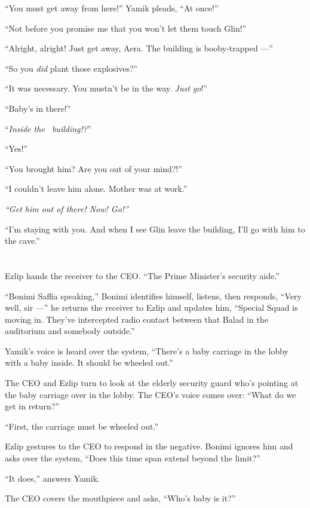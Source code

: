 \documentclass[twoside,11pt]{book}
\begin{document}
``You must get away from here!'' Yamik pleads, ``At
once!''

``Not before you promise me that you won't let them touch Glin!''

``Alright, alright! Just get away, Aera{. T}he building is
booby-trapped ---''

``So you \textit{did}{ }plant those explosives?''

``It was necessary.
You mustn't be in the way. \textit{Just go}!''

``Baby's in there!''

``\textit{Inside the~ building!?}''

``Yes!''

``You brought him? Are you out of your mind?!''

``I couldn't leave him alone{. } Mother was at
work.''

\textit{``Get him out of there! Now! Go!'' }

``I'm staying with you. And when I see Glin leave the building, I'll go with him to the
cave.''



\chapter{}

Ezlip hands the receiver to the CEO. ``The Prime Minister's security aide.''

``Bonimi Saffia speaking,'' Bonimi identifies himself, listens, then responds,
``Very well, sir ---'' he returns the receiver to Ezlip and updates him, ``Special
Squad is moving in. They've intercepted radio contact between that Balad in the auditorium and somebody
outside.''

Yamik's voice is heard over the system, ``There's a baby carriage in the lobby with a baby inside. It
should be wheeled out.''

The CEO and Ezlip turn to look at the elderly security{ }guard who's pointing
at the baby carriage over in the lobby. The CEO's voice comes over: ``What do we get in
return?''

``First, the carriage must be wheeled out.''

Ezlip gestures to the CEO to respond in the negative. Bonimi ignores him and asks over the system, ``Does
this time span extend beyond the limit?''

``It does,'' answers Yamik{.}

The CEO covers the mouthpiece and asks, ``Who's baby is it?''
\end{document}
